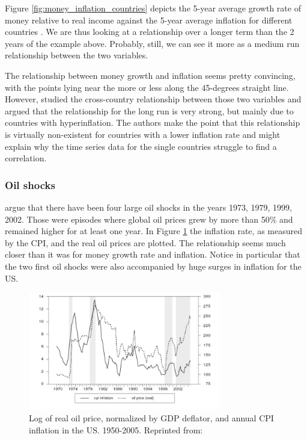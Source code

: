 \documentclass[11pt,a4paper,oneside]{book}
\begin{document}
Figure \ref{fig:money_inflation_countries} depicts the 5-year average growth rate of money relative to real income against the 5-year average inflation for different countries \citet*{Dwyer_Hafer_1999}. We are thus looking at a relationship over a longer term than the 2 years of the example above. Probably, still, we can see it more as a medium run relationship between the two variables.

The relationship between money growth and inflation seems pretty convincing, with the points lying near the more or less along the 45-degrees straight line. However, \citet*{DeGrauwe_Polan_2005} studied the cross-country relationship between those two variables and argued that the relationship for the long run is very strong, but mainly due to countries with hyperinflation. The authors make the point that this relationship is virtually non-existent for countries with a lower inflation rate and might explain why the time series data for the single countries struggle to find a correlation.

\subsubsection{Oil shocks}
\label{subsub:oil_shocks}
\citet{Blanchard_Gali_2010} argue that there have been four large oil shocks in the years 1973, 1979, 1999, 2002. Those were episodes where global oil prices grew by more than 50\% and remained higher for at least one year. In Figure \ref{fig:oil} the inflation rate, as measured by the CPI, and the real oil prices are plotted. The relationship seems much closer than it was for money growth rate and inflation. Notice in particular that the two first oil shocks were also accompanied by huge surges in inflation for the US.

\begin{figure}[h!]
  \centering
    \includegraphics[width=0.75\textwidth]{Oil_shocks_inflation.jpg}
    \caption{Log of real oil price, normalized by GDP deflator, and annual CPI inflation in the US. 1950-2005. Reprinted from: \citet*[p. 12]{Blanchard_Gali_2010}}
    \label{fig:oil}
\end{figure}
\end{document}
